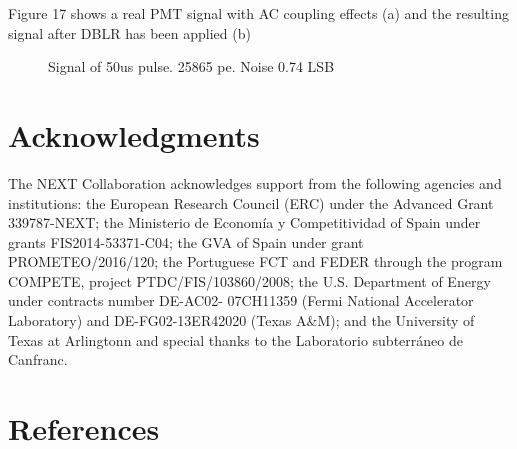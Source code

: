 \documentclass[a4paper, 10pt, oneside, twocolumn, 3p]{elsarticle}
\begin{document}
\par Figure 17 shows a real PMT signal with AC coupling effects (a) and the resulting signal after DBLR has been applied (b) 

\begin{figure}
	\centering
	\hfill
	\caption{Signal of 50us pulse. 25865 pe. Noise 0.74 LSB}
	\label{fig:graph_sig}
\end{figure} 

\section{Acknowledgments}

The NEXT Collaboration acknowledges support from the following agencies and institutions: the European Research Council (ERC) under the Advanced Grant 339787-NEXT; the Ministerio de Econom\'ia y Competitividad of Spain under grants FIS2014-53371-C04; the GVA of Spain under grant PROMETEO/2016/120; the Portuguese FCT and FEDER through the program COMPETE, project PTDC/FIS/103860/2008; the U.S. Department of Energy under contracts number DE-AC02- 07CH11359 (Fermi National Accelerator Laboratory) and DE-FG02-13ER42020 (Texas A\&M); and the University of Texas at Arlingtonn and special thanks to the Laboratorio subterr\'aneo de Canfranc.


\section*{References}


\end{document}
